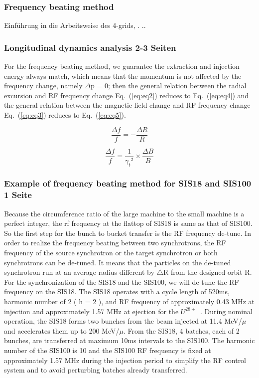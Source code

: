 \subsubsection{Frequency beating method}
Einführung in die Arbeitsweise des 4-grids, .
..
\subsubsection{Longitudinal dynamics analysis 2-3 Seiten}
For the frequency beating method, we guarantee the extraction and injection energy always match, which means that the momentum is not affected by the frequency change, namely $\Delta$p = 0; then the general relation between the radial excursion and RF frequency change Eq.~(\ref{eq:eq2}) reduces to Eq.~(\ref{eq:eq4}) and the general relation between the magnetic field change and RF frequency change Eq.~(\ref{eq:eq3}) reduces to Eq.~(\ref{eq:eq5}).

\begin{equation}
\frac{\Delta{f}}{f} = - \frac{\Delta{R}}{R}
\label{eq:eq4}
\end{equation}

\begin{equation}
\frac{\Delta{f}}{f} =  \frac{1}{{\gamma_t}^2}\times{\frac{\Delta{B}}{B}}
\label{eq:eq5}
\end{equation}

\subsubsection{Example of frequency beating method for SIS18 and SIS100 1 Seite}
Because the circumference ratio of the large machine to the small machine is a perfect integer, the rf frequency at the flattop of SIS18 is same as that of SIS100. So the first step for the bunch to bucket transfer is the RF frequency de-tune. In order to realize the frequency beating between two synchrotrons, the RF frequency of the source synchrotron or the target synchrotron or both synchrotrons can be de-tuned. It means that the particles on the de-tuned synchrotron run at an average radius different by $\bigtriangleup$R from the designed orbit R. For the synchronization of the SIS18 and the SIS100, we will de-tune the RF frequency on the SIS18. The SIS18 operates with a cycle length of 520ms, harmonic number of 2 ( h = 2 ), and RF frequency of approximately 0.43 MHz at injection and approximately 1.57 MHz at ejection for the $U^{28+}$~\cite{SIS18}. During nominal operation, the SIS18 forms two bunches from the beam injected at 11.4 MeV/$\mu$ and accelerates them up to 200 MeV/$\mu$. From the SIS18, 4 batches, each of 2 bunches, are transferred at  maximum 10ms intervals to the SIS100. The harmonic number of the SIS100 is 10 and the SIS100 RF frequency is fixed at approximately 1.57 MHz during the
injection period to simplify the RF control system and to avoid perturbing batches already transferred.

